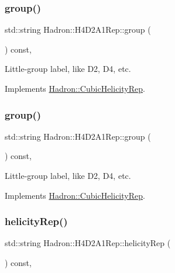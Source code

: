 \subsubsection{\texorpdfstring{group()}{group()}\hspace{0.1cm}{\footnotesize\ttfamily [2/3]}}
{\footnotesize\ttfamily std\+::string Hadron\+::\+H4\+D2\+A1\+Rep\+::group (\begin{DoxyParamCaption}{ }\end{DoxyParamCaption}) const\hspace{0.3cm}{\ttfamily [inline]}, {\ttfamily [virtual]}}

Little-\/group label, like D2, D4, etc. 

Implements \mbox{\hyperlink{structHadron_1_1CubicHelicityRep_a101a7d76cd8ccdad0f272db44b766113}{Hadron\+::\+Cubic\+Helicity\+Rep}}.

\mbox{\label{structHadron_1_1H4D2A1Rep_a08935df457743813b4a774db746d4b54}} 
\subsubsection{\texorpdfstring{group()}{group()}\hspace{0.1cm}{\footnotesize\ttfamily [3/3]}}
{\footnotesize\ttfamily std\+::string Hadron\+::\+H4\+D2\+A1\+Rep\+::group (\begin{DoxyParamCaption}{ }\end{DoxyParamCaption}) const\hspace{0.3cm}{\ttfamily [inline]}, {\ttfamily [virtual]}}

Little-\/group label, like D2, D4, etc. 

Implements \mbox{\hyperlink{structHadron_1_1CubicHelicityRep_a101a7d76cd8ccdad0f272db44b766113}{Hadron\+::\+Cubic\+Helicity\+Rep}}.

\mbox{\label{structHadron_1_1H4D2A1Rep_a64d7b12a9ed77971c31f5ce36e3b22bc}} 
\subsubsection{\texorpdfstring{helicityRep()}{helicityRep()}\hspace{0.1cm}{\footnotesize\ttfamily [1/2]}}
{\footnotesize\ttfamily std\+::string Hadron\+::\+H4\+D2\+A1\+Rep\+::helicity\+Rep (\begin{DoxyParamCaption}{ }\end{DoxyParamCaption}) const\hspace{0.3cm}{\ttfamily [inline]}, {\ttfamily [virtual]}}

